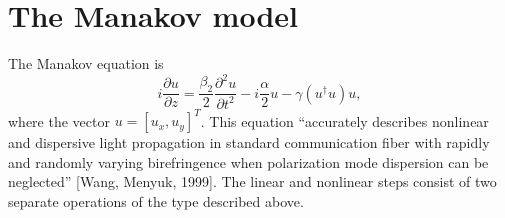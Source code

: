 \documentclass[a4paper, 11pt]{article}
\newcommand{\pdn}[3]{\frac{\partial^{#3}#1}{\partial#2^{#3}}}
\newcommand{\pd}[2]{\frac{\partial#1}{\partial#2}}
\begin{document}
\section{The Manakov model}
The Manakov equation is
\begin{equation}
i \pd{u}{z} = \frac{\beta_2}{2} \pdn{u}{t}{2} - i \frac{\alpha}{2} u -
\gamma (u^\dag u) u,
\end{equation}
where the vector $u = [u_x, u_y]^T$. This equation ``accurately
describes nonlinear and dispersive light propagation in standard
communication fiber with rapidly and randomly varying birefringence
when polarization mode dispersion can be neglected'' [Wang, Menyuk,
1999].  The linear and nonlinear steps consist of two separate
operations of the type described above.
\end{document}
